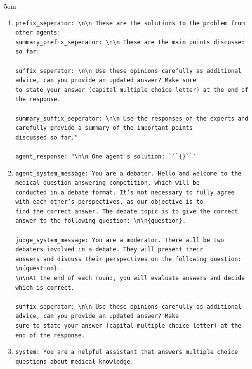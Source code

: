 \begin{adjustwidth}{5em}{}
\begin{enumerate}
\item[SoM MAD:]
\begin{verbatim}
prefix_seperator: \n\n These are the solutions to the problem from other agents: 
summary_prefix_seperator: \n\n These are the main points discussed so far: 

suffix_seperator: \n\n Use these opinions carefully as additional advice, can you provide an updated answer? Make sure 
to state your answer (capital multiple choice letter) at the end of the response.

summary_suffix_seperator: \n\n Use the responses of the experts and carefully provide a summary of the important points 
discussed so far."

agent_response: "\n\n One agent's solution: ```{}```
\end{verbatim}


\item[MP MAD:]
\begin{verbatim}
agent_system_message: You are a debater. Hello and welcome to the medical question answering competition, which will be 
conducted in a debate format. It’s not necessary to fully agree with each other’s perspectives, as our objective is to 
find the correct answer. The debate topic is to give the correct answer to the following question: \n\n{question}.

judge_system_message: You are a moderator. There will be two debaters involved in a debate. They will present their 
answers and discuss their perspectives on the following question: \n{question}.
\n\nAt the end of each round, you will evaluate answers and decide which is correct.

suffix_seperator: \n\n Use these opinions carefully as additional advice, can you provide an updated answer? Make 
sure to state your answer (capital multiple choice letter) at the end of the response.
\end{verbatim}
\item[Medprompt:]
\begin{verbatim}
system: You are a helpful assistant that answers multiple choice questions about medical knowledge.
\end{verbatim}
\end{enumerate}
\end{adjustwidth}